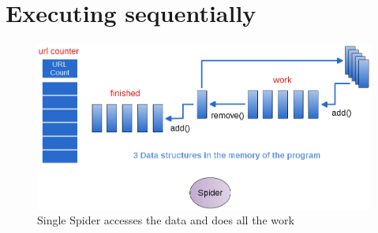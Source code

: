 \documentclass[letterpaper,10pt,openany,oneside]{sphinxmanual}
\begin{document}
\section{Executing sequentially}
\label{URLSpider/URLSpider:executing-sequentially}\begin{figure}[htbp]
\centering
\capstart

\includegraphics{Spider1.png}
\caption{Single Spider accesses the data and does all the work}\end{figure}
\end{document}
